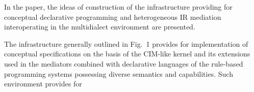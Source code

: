 \begin{multicols}{2}
  In the paper, the ideas of construction of the infrastructure providing for conceptual
declarative programming and heterogeneous IR mediation
interoperating in the multidialect environment are presented. 

The infrastructure
generally outlined in Fig.~1 provides for implementation of conceptual specifications
on the basis of the CIM-like kernel and its extensions used in the mediators combined
with declarative languages of the rule-based programming systems possessing
diverse semantics and capabilities. Such environment provides for\linebreak\vspace*{-12pt}

\pagebreak

\end{multicols}

\begin{figure} %
   \vspace*{1pt}
 \begin{center}
 \mbox{%
 \epsfxsize=92.944mm
 }
 \end{center}
 \vspace*{-3pt}
  \end{figure}

